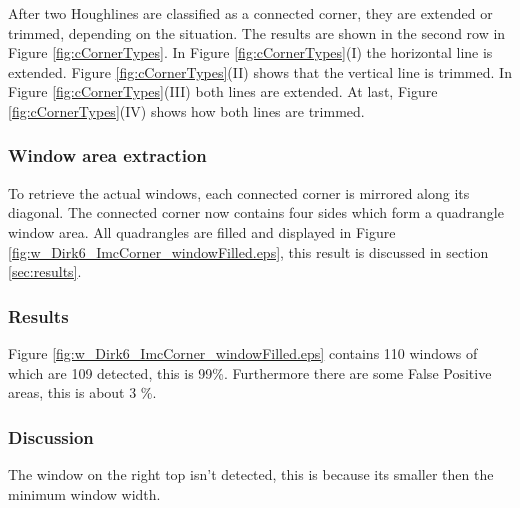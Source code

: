 After two Houghlines are classified as a connected corner, they are extended or
trimmed, depending on the situation. The results are shown in the second row in
Figure \ref{fig:cCornerTypes}.
In Figure \ref{fig:cCornerTypes}(I)  the horizontal line is extended.  Figure
\ref{fig:cCornerTypes}(II) shows that the vertical line is trimmed.  In Figure
\ref{fig:cCornerTypes}(III) both lines are extended.  At last, Figure
\ref{fig:cCornerTypes}(IV) shows how both lines are trimmed.


\subsubsection{Window area extraction}
To retrieve the actual windows, each connected corner is mirrored along its
diagonal. The connected corner now contains four sides which form a 
quadrangle window area.
All quadrangles are filled and displayed in Figure
\ref{fig:w_Dirk6_ImcCorner_windowFilled.eps}, this result is discussed in section
\ref{sec:results}.


\subsubsection{Results}


\newpage
{}

Figure \ref{fig:w_Dirk6_ImcCorner_windowFilled.eps} contains 110 windows of which
are 109 detected, this is 99\%. Furthermore there are some False Positive areas,
this is about 3 \%.  

\subsubsection{Discussion}
The window on the right top isn't detected, this is because
its smaller then the minimum window width.


